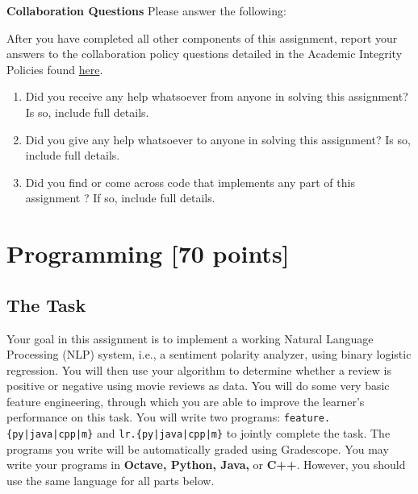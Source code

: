 \documentclass[11pt]{exam}
\numberwithin{equation}{section} %
\numberwithin{figure}{section} %
\numberwithin{table}{section} %
\begin{document}
\textbf{Collaboration Questions} Please answer the following:


    After you have completed all other components of this assignment, report your answers to the collaboration policy questions detailed in the Academic Integrity Policies found \href{http://www.cs.cmu.edu/~mgormley/courses/10601/about.html#7-academic-integrity-policies}{here}.
    \begin{enumerate}
        \item Did you receive any help whatsoever from anyone in solving this assignment? Is so, include full details.
        \item Did you give any help whatsoever to anyone in solving this assignment? Is so, include full details.
        \item Did you find or come across code that implements any part of this assignment ? If so, include full details.
    \end{enumerate}
    
     \begin{your_solution}
    \bigskip \bigskip \bigskip \bigskip \bigskip \bigskip \bigskip \bigskip
    \bigskip \bigskip \bigskip 
  
    \end{your_solution}

\newpage




\section{Programming [70 points]}
\label{programming}

\subsection{The Task}\label{task}

Your goal in this assignment is to implement a working Natural Language Processing (NLP) system, i.e., a sentiment polarity analyzer, using binary logistic regression. You will then use your algorithm to determine whether a review is positive or negative using movie reviews as data. You will do some very basic feature engineering, through which you are able to improve the learner's performance on this task. You will write two programs: \texttt{feature.\{py|java|cpp|m\}} and \texttt{lr.\{py|java|cpp|m\}} to jointly complete the task. The programs you write will be automatically graded using Gradescope. You may write your programs in {\bf Octave, Python, Java,} or {\bf C++}. However, you should use the same language for all parts below.
\end{document}
